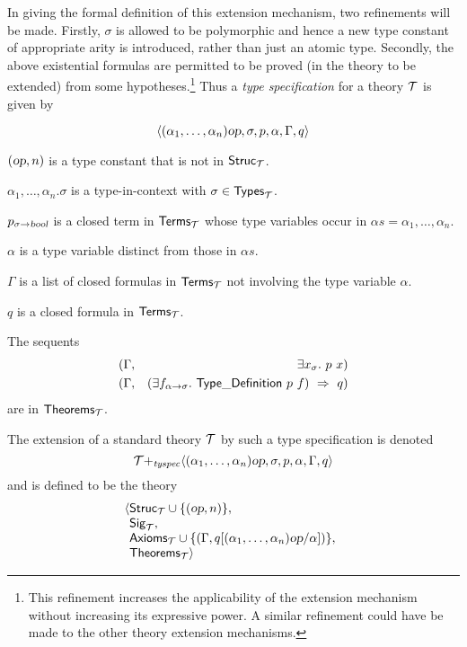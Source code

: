 In giving the formal definition of this extension mechanism, two
refinements will be made. Firstly, $\sigma$ is allowed to be
polymorphic and hence a new type constant of appropriate arity is
introduced, rather than just an atomic type. Secondly, the above
existential formulas are permitted to be proved (in the theory to be
extended) from some hypotheses.\footnote{This refinement increases the
applicability of the extension mechanism without increasing its
expressive power. A similar refinement could have be made to the other
theory extension mechanisms.} Thus a {\em type
specification\/} for a theory $\cal T$ is
given by

\medskip

\[
\langle (\alpha_1,\ldots,\alpha_n)\textsl{op},\sigma,p,\alpha,\Gamma,q\rangle
\]


\begin{myenumerate}
\item
$(\textsl{op},n)$ is a type constant that is not in
${\sf Struc}_{\cal T}$.

\item
$\alpha_1,\ldots,\alpha_n.\sigma$ is a type-in-context with
$\sigma\in{\sf Types}_{\cal T}$.

\item $p_{\sigma{\to}\textsl{bool}}$ is a closed term in ${\sf Terms}_{\cal T}$
whose type variables occur in $\alpha\!s=\alpha_1,\ldots,\alpha_n$.

\item $\alpha$ is a type variable distinct from those in
$\alpha\!s$.

\item $\Gamma$ is a list of closed formulas in ${\sf Terms}_{\cal T}$
not involving the type variable $\alpha$.

\item $q$  is a closed formula in ${\sf Terms}_{\cal T}$.

\item The sequents
\begin{eqnarray*}
(\Gamma & , & \exists x_\sigma.\ p\ x )\\
(\Gamma & , & (\exists f_{\alpha{\to}\sigma}.\ {\sf Type\_Definition}\
                 p\ f)\ \Rightarrow\ q )
\end{eqnarray*}
are in ${\sf Theorems}_{\cal T}$.

\end{myenumerate}
The extension of a standard theory $\cal T$ by such a type
specification is denoted
\[
{\cal T}{+_{\it tyspec}} \langle
(\alpha_1,\ldots,\alpha_n)\textsl{op},\sigma,p,\alpha,\Gamma,q\rangle
\]
and is defined to be the theory
\[
\langle
\begin{array}[t]{@{}l}
{\sf Struc}_{\cal T}\cup\{(\ty{op},n)\},\\
  {\sf Sig}_{\cal T},\\
  {\sf Axioms}_{\cal
  T}\cup\{(\Gamma , q[(\alpha_1,\ldots,\alpha_n)\ty{op}/\alpha])\},\\
  {\sf Theorems}_{\cal T}\rangle
\end{array}
\]

